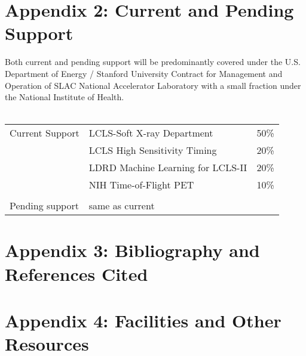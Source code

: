 
\appendix
\section*{Appendix 2: Current and Pending Support}
Both current and pending support will be predominantly covered under the U.S. Department of Energy / Stanford University Contract for Management and Operation of SLAC National Accelerator Laboratory with a small fraction under the National Institute of Health.\\
\vspace{\baselineskip}\\
\begin{tabular}{lll}
Current Support & LCLS-Soft X-ray Department & 50\%  \\
		& LCLS High Sensitivity Timing & 20\% \\
		& LDRD Machine Learning for LCLS-II & 20\%  \\
		& NIH Time-of-Flight PET & 10\% \\
		\vspace{2\baselineskip} &&\\
Pending support&same as current & \\
\end{tabular}

\clearpage
\appendix
\section*{Appendix 3: Bibliography and References Cited}




\clearpage
\appendix
\section*{Appendix 4: Facilities and Other Resources}


